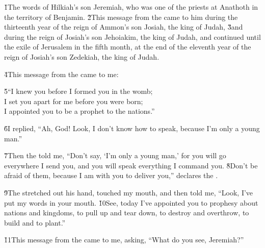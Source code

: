 


\v{1}The words of Hilkiah's son Jeremiah, who was one of the priests at Anathoth in the territory of Benjamin. \v{2}This message from the  came to him during the thirteenth year of the reign of Ammon's son Josiah, the king of Judah, \v{3}and during the reign of Josiah's son Jehoiakim, the king of Judah, and continued until the exile of Jerusalem in the fifth month, at the end of the eleventh year of the reign of Josiah's son Zedekiah, the king of Judah.

\v{4}This message from the  came to me:

\begin{poetry}
\poeml \v{5}``I knew you before I formed you in the womb; \\
\poemll    I set you apart for me before you were born; \\
\poemlll       I appointed you to be a prophet to the nations.''
\end{poetry}

\v{6}I replied, ``Ah,  God! Look, I don't know how to speak, because I'm only a young man.''

\v{7}Then the  told me, ``Don't say, `I'm only a young man,' for you will go everywhere I send you, and you will speak everything I command you. \v{8}Don't be afraid of them, because I am with you to deliver you,'' declares the .

\v{9}The  stretched out his hand, touched my mouth, and then told me, ``Look, I've put my words in your mouth. \v{10}See, today I've appointed you to prophesy about nations and kingdoms, to pull up and tear down, to destroy and overthrow, to build and to plant.''

\v{11}This message from the  came to me, asking, ``What do you see, Jeremiah?''

